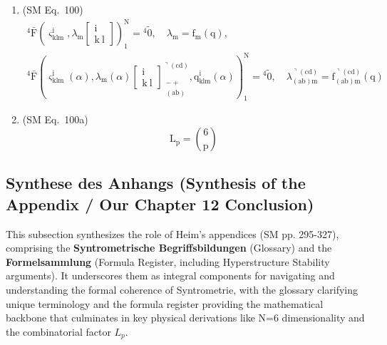 \documentclass[12pt]{article}
\begin{document}
\begin{enumerate}[label=(\arabic*), series=formellist]
    \item (SM Eq.\ 100) 
    \[
    \begin{gathered}
    {}^4\bar{\mathrm{F}}\left( \varsigma^\mathrm{i}_{\mathrm{klm}}, \lambda_\mathrm{m} \left[ \begin{smallmatrix} \mathrm{i} \\ \mathrm{k\ l} \end{smallmatrix} \right] \right)_1^\mathrm{N} = {}^4\tilde{0}, \quad \lambda_\mathrm{m} = \mathrm{f_m}(\mathrm{q}), \\
    {}^4\bar{\mathrm{F}}\left( \varsigma^\mathrm{i}_{\mathrm{klm}}(\alpha), \lambda_\mathrm{m}(\alpha) \left[ \begin{smallmatrix} \mathrm{i} \\ \mathrm{k\ l} \end{smallmatrix} \right]^{\urcorner(\mathrm{cd})}_{\substack{- + \\ (\mathrm{ab})}}, \mathrm{q}^\mathrm{i}_{\mathrm{klm}}(\alpha) \right)_1^\mathrm{N} = {}^4\tilde{0}, \quad \lambda^{\urcorner(\mathrm{cd})}_{(\mathrm{ab})\mathrm{m}} = \mathrm{f}^{\urcorner(\mathrm{cd})}_{(\mathrm{ab})\mathrm{m}}(\mathrm{q})
    \end{gathered}
    \]

    \item (SM Eq.\ 100a) 
    \[
    \mathrm{L_p} = \binom{6}{\mathrm{p}}
    \]
\end{enumerate} 
\subsection{Synthese des Anhangs (Synthesis of the Appendix / Our Chapter 12 Conclusion)}
\label{sec:appendix_synthesis}

This subsection synthesizes the role of Heim's appendices (SM pp. 295-327), comprising the \textbf{Syntrometrische Begriffsbildungen} (Glossary) and the \textbf{Formelsammlung} (Formula Register, including Hyperstructure Stability arguments). It underscores them as integral components for navigating and understanding the formal coherence of Syntrometrie, with the glossary clarifying unique terminology and the formula register providing the mathematical backbone that culminates in key physical derivations like N=6 dimensionality and the combinatorial factor \(L_p\).
\end{document}
